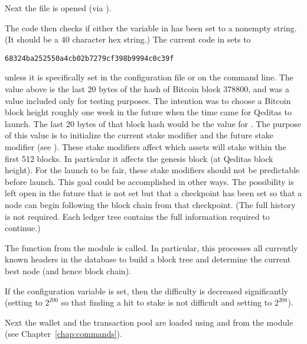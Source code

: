 Next the {} file is opened (via {}).

The code then checks if either the {} variable in {}
has been set to a nonempty string. (It should be a 40 character hex string.)
The current code in {} sets {} to
\begin{verbatim}
68324ba252550a4cb02b7279cf398b9994c0c39f
\end{verbatim}
unless it is specifically set in the configuration file or on the command line.
The value above is the last 20 bytes of the hash of Bitcoin block 378800,
and was a value included only for testing purposes.
The intention was to choose a Bitcoin block height roughly one week in the future
when the time came for Qeditas to launch. The last 20 bytes of that block hash would
be the value for {}. The purpose of this value is to initialize the
current stake modifier and the future stake modifier (see {}).
These stake modifiers affect which assets will stake within the first 512 blocks.
In particular it affects the genesis block (at Qeditas block height).
For the launch to be fair, these stake modifiers should not be predictable before launch.
This goal could be accomplished in other ways.
The possibility is left open in the future that {} is not set but
that a checkpoint has been set so that a node can begin following the block chain
from that checkpoint. (The full history is not required. Each ledger tree contains
the full information required to continue.)

The function {} from the {} module
is called. In particular, this processes all currently known headers in the database
to build a block tree and determine the current best node (and hence block chain).

If the {} configuration variable is set, then the difficulty is decreased significantly
(setting {} to $2^{200}$ so that finding a hit to stake is not difficult
and setting {} to $2^{208}$).

Next the wallet and the transaction pool are loaded using {} and {} from the {} module (see Chapter~\ref{chap:commands}).

